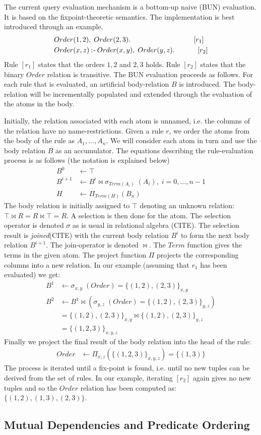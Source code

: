 The current query evaluation mechanism is a bottom-up naive (BUN) \cite{Green:2013:DRQ:2688167.2688168} evaluation. It is based on the fixpoint-theoretic semantics. The implementation is best introduced through an example.
\begin{align*}
&Order(1, 2),\; Order(2, 3). \quad\quad\quad\quad\quad\quad\quad\quad\quad[r_1]\\
&Order(x, z) \mathbin{:\hspace{-0.5ex}\textsf{-}} Order(x, y),\; Order(y, z). \;\quad\quad\quad[r_2]
\end{align*}
\noindent
Rule $[r_1]$ states that the orders $1, 2$ and $2, 3$ holds. Rule $[r_2]$ states that the binary $Order$ relation is transitive. The BUN evaluation proceeds as follows. For each rule that is evaluated, an artificial body-relation $B$ is introduced. The body-relation will be incrementally populated and extended through the evaluation of the atoms in the body. 

Initially, the relation associated with each atom is unnamed, i.e. the columns of the relation have no name-restrictions. Given a rule $r$, we order the atoms from the body of the rule as $A_1, \ldots, A_n$. We will consider each atom in turn and use the body relation $B$ as an accumulator. The equations describing the rule-evaluation process is as follows (the notation is explained below)
\begin{align*}
B^{0} &\leftarrow \top \\
B^{i + 1} &\leftarrow B^{i} \bowtie \sigma_{Term(A_i)}\;(A_i), \; i = 0, \ldots, n - 1\\
H & \leftarrow \Pi_{Term(H)}(B_n)
\end{align*}
\noindent
The body relation is initially assigned to $\top$ denoting an unknown relation: $\top \bowtie R = R \bowtie \top = R$. A selection is then done for the atom. The selection operator is denoted $\sigma$ as is usual in relational algebra (CITE). The selection result is \textit{joined}(CITE) with the current body relation $B^{i}$ to form the next body relation $B^{i + 1}$. The join-operator is denoted $\bowtie$. The $Term$ function gives the terms in the given atom. The project function $\Pi$ projects the corresponding columns into a new relation. In our example (assuming that $r_1$ has been evaluated) we get:
\begin{align*}
B^{1} &\leftarrow \sigma_{x, y}\;(Order) = \{(1, 2), (2, 3)\}_{x, y}\\
B^{2} &\leftarrow B^{1} \bowtie (\sigma_{y, z}\;(Order) = \{(1, 2), (2, 3)\}_{y, z})\\
      &= \{(1, 2), (2, 3)\}_{x, y} \bowtie \{(1, 2), (2, 3)\}_{y, z}\\
      &= \{(1,2,3)\}_{x,y,z}
\end{align*}
\noindent
Finally we project the final result of the body relation into the head of the rule:
\begin{align*}
Order & \leftarrow \Pi_{x,z}(\{(1,2,3)\}_{x,y,z}) = \{(1,3)\}
\end{align*}
\noindent
The process is iterated until a fix-point is found, i.e. until no new tuples can be derived from the set of rules. In our example, iterating $[r_2]$ again gives no new tuples and so the $Order$ relation has been computed as: $\{(1,2), (1,3), (2,3) \}$.

\subsection{Mutual Dependencies and Predicate Ordering}
